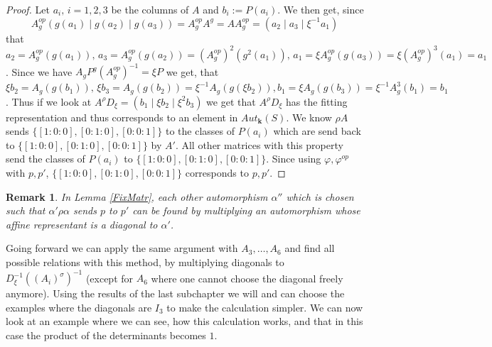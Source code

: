 \documentclass[12pt, oneside, reqno]{amsart}
\newtheorem{remark}[theorem]{Remark}
\begin{document}
\begin{proof}
      Let $a_i, \, i=1,2,3$ be the columns of $A$ and $b_i := P(a_i)$. We then get, since \[A_g^{op}(g(a_1) \mid g(a_2) \mid g(a_3)) = A_g^{op} A^g = A A_g^{op} = (a_2 \mid a_3 \mid \xi^{-1} a_1)\] that $a_2 = A_g^{op}(g(a_1)), \, a_3 = A_g^{op} (g(a_2)) = (A_g^{op})^2(g^2(a_1)), \, a_1 = \xi A_g^{op}(g(a_3)) = \xi (A_g^{op})^3 (a_1) = a_1$. Since we have $A_g  P^g (A_g^{op})^{-1} = \xi P$ we get, that $\xi b_2 = A_g(g(b_1)), \, \xi b_3 = A_g(g(b_2)) = \xi^{-1} A_g(g(\xi b_2)),  b_1 = \xi A_g(g(b_3)) = \xi^{-1} A_g^3(b_1) = b_1$. Thus if we look at $A^{\rho} D_{\xi} = (b_1 \mid \xi b_2 \mid \xi^2 b_3)$ we get that $A^{\rho} D_{\xi}$ has the fitting representation and thus corresponds to an element in $Aut_{\textbf{k}}(S)$. We know $\rho A$ sends $\{ [1:0:0], [0:1:0],[0:0:1]\}$ to the classes of $P(a_i)$ which are send back to $\{ [1:0:0], [0:1:0],[0:0:1]\}$ by $A'$. All other matrices with this property send the classes of $P(a_i)$ to $\{ [1:0:0], [0:1:0],[0:0:1]\}$. Since using $\varphi, \varphi^{op}$ with $p,p'$, $\{ [1:0:0], [0:1:0],[0:0:1]\}$ corresponds to $p,p'$.      
\end{proof}
\begin{remark}
    In Lemma \ref{FixMatr}, each other automorphism $\alpha''$ which is chosen such that $\alpha' \rho \alpha$ sends $p$ to $p'$ can be found by multiplying an automorphism whose affine representant is a diagonal to $\alpha'$.
\end{remark}
\noindent
 Going forward we can apply the same argument with $A_3, \dots , A_6$ and find all possible relations with this method, by multiplying diagonals to $D_{\xi}^{-1}((A_i)^{\sigma})^{-1}$ (except for $A_6$ where one cannot choose the diagonal freely anymore). Using the results of the last subchapter we will and can choose the examples where the diagonals are $I_3$ to make the calculation simpler. We can now look at an example where we can see, how this calculation works, and that in this case the product of the determinants becomes $1$.
\end{document}
